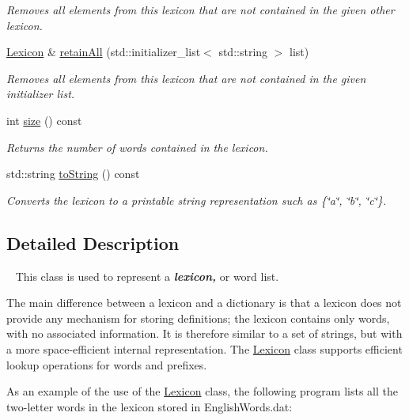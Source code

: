 \begin{DoxyCompactItemize}
\begin{DoxyCompactList}\small\item\em Removes all elements from this lexicon that are not contained in the given other lexicon. \end{DoxyCompactList}\item 
\mbox{\hyperlink{classLexicon}{Lexicon}} \& \mbox{\hyperlink{classLexicon_a17b175aadba16c14093da01963914b33}{retain\+All}} (std\+::initializer\+\_\+list$<$ std\+::string $>$ list)
\begin{DoxyCompactList}\small\item\em Removes all elements from this lexicon that are not contained in the given initializer list. \end{DoxyCompactList}\item 
int \mbox{\hyperlink{classLexicon_af9593d4a5ff4274efaf429cb4f9e57cc}{size}} () const
\begin{DoxyCompactList}\small\item\em Returns the number of words contained in the lexicon. \end{DoxyCompactList}\item 
std\+::string \mbox{\hyperlink{classLexicon_a1fe5121d6528fdea3f243321b3fa3a49}{to\+String}} () const
\begin{DoxyCompactList}\small\item\em Converts the lexicon to a printable string representation such as {\ttfamily \{\char`\"{}a\char`\"{}, \char`\"{}b\char`\"{}, \char`\"{}c\char`\"{}\}}. \end{DoxyCompactList}\end{DoxyCompactItemize}


\subsection{Detailed Description}
~\newline
 This class is used to represent a {\bfseries {\itshape lexicon,}} or word list. 

The main difference between a lexicon and a dictionary is that a lexicon does not provide any mechanism for storing definitions; the lexicon contains only words, with no associated information. It is therefore similar to a set of strings, but with a more space-\/efficient internal representation. The {\ttfamily \mbox{\hyperlink{classLexicon}{Lexicon}}} class supports efficient lookup operations for words and prefixes.

As an example of the use of the {\ttfamily \mbox{\hyperlink{classLexicon}{Lexicon}}} class, the following program lists all the two-\/letter words in the lexicon stored in {\ttfamily English\+Words.\+dat}\+:


